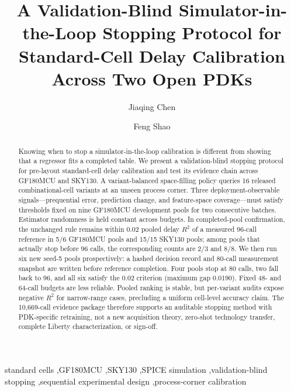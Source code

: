 \documentclass[preprint,12pt]{elsarticle}
\begin{document}
\begin{frontmatter}

\title{A Validation-Blind Simulator-in-the-Loop Stopping Protocol for Standard-Cell Delay Calibration Across Two Open PDKs}

\author[aff1]{Jiaqing Chen}

\author[aff1]{Feng Shao}


\begin{abstract}
Knowing when to stop a simulator-in-the-loop calibration is different from showing that a regressor fits a completed table. We present a validation-blind stopping protocol for pre-layout standard-cell delay calibration and test its evidence chain across GF180MCU and SKY130. A variant-balanced space-filling policy queries 16 released combinational-cell variants at an unseen process corner. Three deployment-observable signals---prequential error, prediction change, and feature-space coverage---must satisfy thresholds fixed on nine GF180MCU development pools for two consecutive batches. Estimator randomness is held constant across budgets. In completed-pool confirmation, the unchanged rule remains within 0.02 pooled delay $R^2$ of a measured 96-call reference in 5/6 GF180MCU pools and 15/15 SKY130 pools; among pools that actually stop before 96 calls, the corresponding counts are 2/3 and 8/8. We then run six new seed-5 pools prospectively: a hashed decision record and 80-call measurement snapshot are written before reference completion. Four pools stop at 80 calls, two fall back to 96, and all six satisfy the 0.02 criterion (maximum gap 0.0190). Fixed 48- and 64-call budgets are less reliable. Pooled ranking is stable, but per-variant audits expose negative $R^2$ for narrow-range cases, precluding a uniform cell-level accuracy claim. The 10,669-call evidence package therefore supports an auditable stopping method with PDK-specific retraining, not a new acquisition theory, zero-shot technology transfer, complete Liberty characterization, or sign-off.
\end{abstract}

\begin{keyword}
standard cells \sep GF180MCU \sep SKY130 \sep SPICE simulation \sep validation-blind stopping \sep sequential experimental design \sep process-corner calibration
\end{keyword}

\end{frontmatter}
\end{document}
